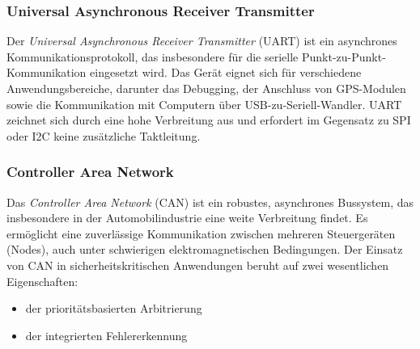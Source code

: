 

\subsubsection*{Universal Asynchronous Receiver Transmitter}
Der \emph{Universal Asynchronous Receiver Transmitter} (UART) ist ein asynchrones Kommunikationsprotokoll, das insbesondere für die serielle Punkt-zu-Punkt-Kommunikation eingesetzt wird. 
Das Gerät eignet sich für verschiedene Anwendungsbereiche, darunter das Debugging, der Anschluss von GPS-Modulen sowie die Kommunikation mit Computern über USB-zu-Seriell-Wandler. 
UART zeichnet sich durch eine hohe Verbreitung aus und erfordert im Gegensatz zu SPI oder I2C keine zusätzliche Taktleitung.

\subsubsection*{Controller Area Network}
Das \emph{Controller Area Network} (CAN) ist ein robustes, asynchrones Bussystem, das insbesondere in der Automobilindustrie eine weite Verbreitung findet. 
Es ermöglicht eine zuverlässige Kommunikation zwischen mehreren Steuergeräten (Nodes), auch unter schwierigen elektromagnetischen Bedingungen. 
Der Einsatz von CAN in sicherheitskritischen Anwendungen beruht auf zwei wesentlichen Eigenschaften: 
\begin{itemize}
	\item der prioritätsbasierten Arbitrierung
	\item der integrierten Fehlererkennung
\end{itemize}
 
